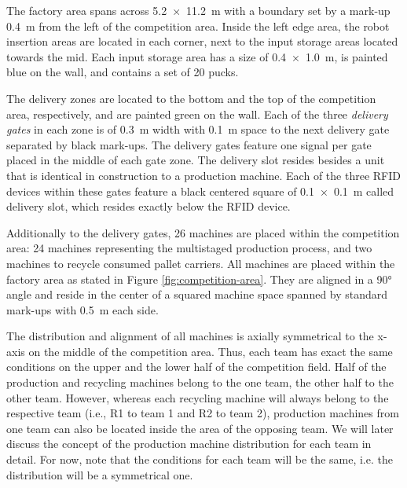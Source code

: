 \documentclass[12pt,twoside]{article}
\begin{document}
The factory area spans across \SI{5.2 x 11.2}{\metre} with a boundary
set by a mark-up \SI{0.4}{\metre} from the left of the competition
area. Inside the left edge area, the robot insertion areas are located
in each corner, next to the input storage areas located towards the
mid. Each input storage area has a size of \SI{0.4 x 1.0}{\metre}, is
painted blue on the wall, and contains a set of 20 pucks.

The delivery zones are located to the bottom and the top of the
competition area, respectively, and are painted green on the
wall. Each of the three \textit{delivery gates} in each zone is of
\SI{0.3}{\metre} width with \SI{0.1}{\metre} space to the next
delivery gate separated by black mark-ups. The delivery gates feature
one signal per gate placed in the middle of each gate zone. The
delivery slot resides besides a unit that is identical in construction
to a production machine. Each of the three RFID devices within these
gates feature a black centered square of \SI{0.1 x 0.1}{\metre} called
delivery slot, which resides exactly below the RFID device.

Additionally to the delivery gates, 26 machines are placed within the
competition area: 24 machines representing the multistaged production
process, and two machines to recycle consumed pallet carriers. All
machines are placed within the factory area as stated in Figure
\ref{fig:competition-area}. They are aligned in a \ang{90} angle and
reside in the center of a squared machine space spanned by standard
mark-ups with \SI{0.5}{\metre} each side.

The distribution and alignment of all machines is axially symmetrical
to the x-axis on the middle of the competition area. Thus, each team
has exact the same conditions on the upper and the lower half of the
competition field. Half of the production and recycling machines
belong to the one team, the other half to the other team. However,
whereas each recycling machine will always belong to the respective
team (i.e., R1 to team 1 and R2 to team 2), production machines from
one team can also be located inside the area of the opposing team. We
will later discuss the concept of the production machine distribution
for each team in detail. For now, note that the conditions for each
team will be the same, i.e. the distribution will be a symmetrical
one.
\end{document}
